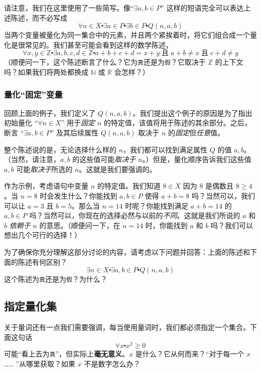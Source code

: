 请注意，我们在这里使用了一些简写。像``$\exists a, b \in P$'' 这样的短语完全可以表达上述陈述，而不必写成
\[\forall n \in X \centerdot \exists a \in P \centerdot \exists b \in P \centerdot Q(n, a, b)\]
当两个变量被量化为同一集合中的元素，并且两个紧挨着时，将它们组合成一个量化是很常见的。我们甚至可能会看到这样的数学陈述，
\[\forall x, y \in \mathbb{Z} \centerdot \exists a, b, c, d \in \mathbb{Z} \centerdot a + b + c + d = x + y \;\text{且}\; a + b \ne x \;\text{且}\; c + d \ne y\]
（顺便问一下，这个陈述断言了什么？它为\verb|真|还是为\verb|假|？它取决于 $\mathbb{Z}$ 的上下文吗？如果我们将两处都换成 $\mathbb{N}$ 或 $\mathbb{R}$ 会怎样？）

\subsubsection*{量化``固定''变量}

回顾上面的例子，我们定义了 $Q(n, a, b)$。我们提出这个例子的原因是为了指出初始量化 ``$\forall n \in X$'' 用于\emph{固定} $n$ 的特定值，该值将用于陈述的其余部分。之后，断言 ``$\exists a, b \in P$'' 及其后续属性 $Q(n, a, b)$ 取决于 $n$ 的\emph{固定}但\emph{任意}值。

整个陈述说的是，无论选择什么样的 $n$，我们都可以找到满足属性 $Q$ 的值 $a, b$。（当然，请注意，$a, b$ 的这些值可能\emph{取决于} $n$。）但是，量化顺序告诉我们这些值 $a, b$ 可能\emph{取决于}所选的 $n$。这就是我们要强调的。

作为示例，考虑语句中变量 $n$ 的特定值。我们知道 $8 \in X$ 因为 $8$ 是偶数且 $8 \ge 4$。当 $n = 8$ 时会发生什么？你能找到 $a, b \in P$ 使得 $a + b = 8$ 吗？当然可以，我们可以让 $a = 3$ 且 $b = 5$。那么当 $n = 14$ 时呢？你能找到满足 $a+b = 14$ 的 $a, b \in P$ 吗？当然可以，你现在的选择必然与以前的\emph{不同}。这就是我们所说的 $a$ 和 $b$ \emph{依赖于} $n$ 的意思。（顺便问一下，在 $n = 14$ 时，你能找到 $a$ 和 $b$ 吗？我们可以想出几个可行的选择！）

为了确保你充分理解这部分讨论的内容，请考虑以下问题并回答：上面的陈述和下面的陈述有何区别？
\[\exists n \in X \centerdot \exists a, b \in P \centerdot Q(n, a, b)\]
这个陈述为\verb|真|还是为\verb|假|？为什么？

\subsection{指定量化集}

关于量词还有一点我们需要强调，每当使用量词时，我们都必须指定一个集合。下面这句话
\[\forall x \centerdot x^2 \ge 0\]
可能``看上去为\verb|真|''，但实际上\textbf{毫无意义}。$x$ 是什么？它从何而来？``对于每一个 $x$ …… ''从哪里获取？如果 $x$ 不是数字怎么办？

